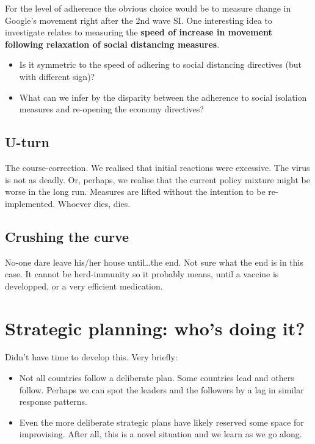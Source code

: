 \documentclass[
  english,
  ,doc,floatsintext]{apa6}
\providecommand{\tightlist}{%
  \setlength{\itemsep}{0pt}\setlength{\parskip}{0pt}}
\begin{document}
For the level of adherence the obvious choice would be to measure change in Google's movement right after the 2nd wave SI.
One interesting idea to investigate relates to measuring the \textbf{speed of increase in movement following relaxation of social distancing measures}.

\begin{itemize}
\tightlist
\item
  Is it symmetric to the speed of adhering to social distancing directives (but with different sign)?
\item
  What can we infer by the disparity between the adherence to social isolation measures and re-opening the economy directives?
\end{itemize}

\hypertarget{u-turn}{%
\subsection{U-turn}\label{u-turn}}

The course-correction. We realised that initial reactions were excessive. The virus is not as deadly. Or, perhaps, we realise that the current policy mixture might be worse in the long run. Measures are lifted without the intention to be re-implemented. Whoever dies, dies.

\hypertarget{crushing-the-curve}{%
\subsection{Crushing the curve}\label{crushing-the-curve}}

No-one dare leave his/her house until\ldots the end. Not sure what the end is in this case. It cannot be herd-immunity so it probably means, until a vaccine is developped, or a very efficient medication.

\hypertarget{strategic-planning-whos-doing-it}{%
\section{Strategic planning: who's doing it?}\label{strategic-planning-whos-doing-it}}

Didn't have time to develop this. Very briefly:

\begin{itemize}
\tightlist
\item
  Not all countries follow a deliberate plan. Some countries lead and others follow. Perhaps we can spot the leaders and the followers by a lag in similar response patterns.
\item
  Even the more deliberate strategic plans have likely reserved some space for improvising. After all, this is a novel situation and we learn as we go along.
\end{itemize}
\end{document}
